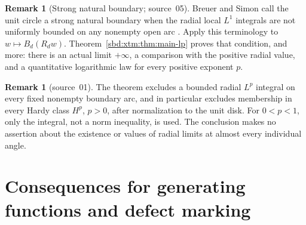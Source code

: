 \documentclass[11pt,a4paper]{article}
\theoremstyle{definition}
\newtheorem{remark}[theorem]{Remark}
\begin{document}
\begin{remark}[Strong natural boundary; source~05]\label{sbd:xtm:rem:strong}
Breuer and Simon call the unit circle a strong natural boundary when the
radial local $L^1$ integrals are not uniformly bounded on any nonempty open
arc \cite{breuersimon}. Apply this terminology to $w\mapsto B_d(R_dw)$.
Theorem~\ref{sbd:xtm:thm:main-lp} proves that condition, and more: there is
an actual limit $+\infty$, a comparison with the positive radial value, and
a quantitative logarithmic law for every positive exponent $p$.
\end{remark}

\begin{remark}[source~01]\label{sbd:edge:rem:hardy}
The theorem excludes a bounded radial $L^p$ integral on every fixed nonempty
boundary arc, and in particular excludes membership in every Hardy class
$H^p$, $p>0$, after normalization to the unit disk. For $0<p<1$, only the
integral, not a norm inequality, is used. The conclusion makes no assertion
about the existence or values of radial limits at almost every individual
angle.
\end{remark}

\section{Consequences for generating functions and defect marking}
\label{sbd:xtm:sec:consequences}
\end{document}
